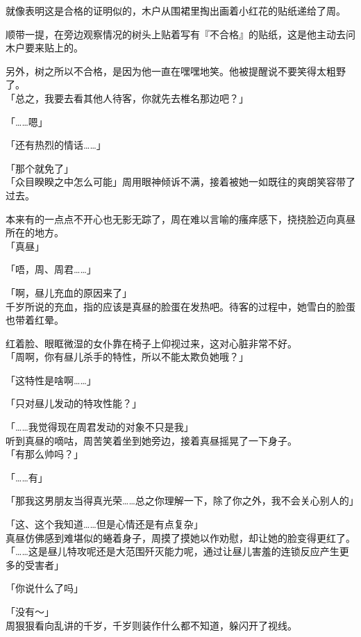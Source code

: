 就像表明这是合格的证明似的，木户从围裙里掏出画着小红花的贴纸递给了周。

顺带一提，在旁边观察情况的树头上贴着写有『不合格』的贴纸，这是他主动去问木户要来贴上的。

另外，树之所以不合格，是因为他一直在嘿嘿地笑。他被提醒说不要笑得太粗野了。\\

「总之，我要去看其他人待客，你就先去椎名那边吧？」

「……嗯」

「还有热烈的情话……」

「那个就免了」\\

「众目睽睽之中怎么可能」周用眼神倾诉不满，接着被她一如既往的爽朗笑容带了过去。

本来有的一点点不开心也无影无踪了，周在难以言喻的瘙痒感下，挠挠脸迈向真昼所在的地方。\\

「真昼」

「唔，周、周君……」

「啊，昼儿充血的原因来了」\\

千岁所说的充血，指的应该是真昼的脸蛋在发热吧。待客的过程中，她雪白的脸蛋也带着红晕。

红着脸、眼眶微湿的女仆靠在椅子上仰视过来，这对心脏非常不好。\\

「周啊，你有昼儿杀手的特性，所以不能太欺负她哦？」

「这特性是啥啊……」

「只对昼儿发动的特攻性能？」

「……我觉得现在周君发动的对象不只是我」\\

听到真昼的嘀咕，周苦笑着坐到她旁边，接着真昼摇晃了一下身子。\\

「有那么帅吗？」

「……有」

「那我这男朋友当得真光荣……总之你理解一下，除了你之外，我不会关心别人的」

「这、这个我知道……但是心情还是有点复杂」\\

真昼仿佛感到难堪似的蜷着身子，周摸了摸她以作劝慰，却让她的脸变得更红了。\\

「……这是昼儿特攻呢还是大范围歼灭能力呢，通过让昼儿害羞的连锁反应产生更多的受害者」

「你说什么了吗」

「没有～」\\

周狠狠看向乱讲的千岁，千岁则装作什么都不知道，躲闪开了视线。
